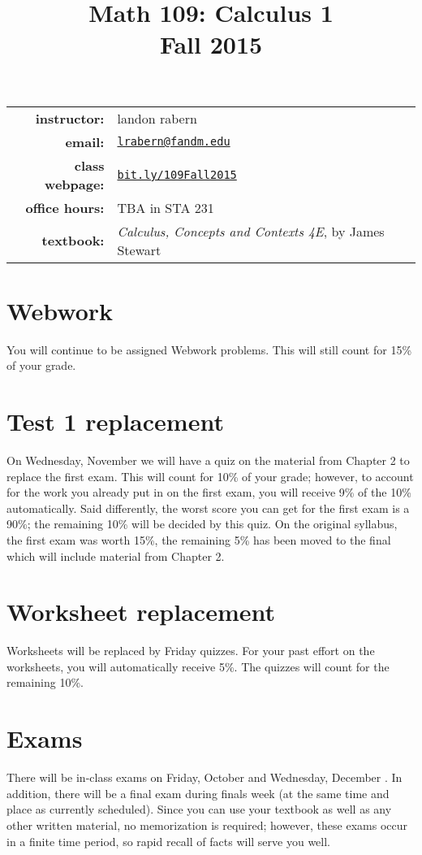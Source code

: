 \documentclass[10pt]{article}
\title{Math 109: Calculus 1\\ \bigskip\small{Fall 2015}}
\date{}
\begin{document}
\maketitle

\begin{tabular}{r l}
\textbf{instructor:}& landon rabern\\
\textbf{email:}& \href{mailto:lrabern@fandm.edu}{\nolinkurl{lrabern@fandm.edu}}\\
\textbf{class webpage:}& \href{http://bit.ly/109Fall2015}{\nolinkurl{bit.ly/109Fall2015}}\\
\textbf{office hours:}& TBA in STA 231\\
\textbf{textbook:}&\textit{Calculus, Concepts and Contexts 4E}, by James Stewart\\
\end{tabular}

\section*{Webwork} 
You will continue to be assigned Webwork problems. This will still count for 15\% of your grade.
\section*{Test 1 replacement}
On Wednesday, November  we will have a quiz on the material from Chapter 2 to replace the first exam. This will count for 10\% of your grade; however, to account for the work you already put in on the first exam, you will receive 9\% of the 10\% automatically.  Said differently, the worst score you can get for the first exam is a 90\%; the remaining 10\% will be decided by this quiz.  On the original syllabus, the first exam was worth 15\%, the remaining 5\% has been moved to the final which will include material from Chapter 2.

\section*{Worksheet replacement}
Worksheets will be replaced by Friday quizzes. For your past effort on the worksheets, you will automatically receive 5\%.  The quizzes will count for the remaining 10\%.

\section*{Exams}
There will be in-class exams on Friday, October  and Wednesday, December .  In addition, there will be a final exam during finals week (at the same time and place as currently scheduled).
Since you can use your textbook as well as any other written material, no memorization is required; however, these exams occur in a finite time period, so rapid recall of facts will serve you well. 
\end{document}
